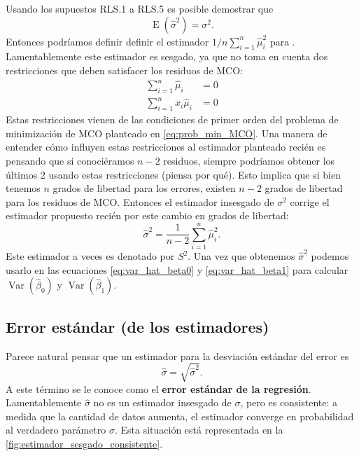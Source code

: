 \documentclass{report}\usepackage[]{graphicx}\usepackage[]{color}
\newcommand*{\kw}[1]{\textbf{#1}\index{#1}}
\newcommand{\Var}{\operatorname{Var}}
\newcommand{\E}{\operatorname{E}}
\begin{document}
Usando los supuestos RLS.1 a RLS.5 es posible demostrar que
\begin{equation}
\E(\hat\sigma^2) = \sigma^2.
\end{equation}
Entonces podríamos definir definir el estimador $1/n \sum_{i=1}^n \hat\mu_i^2$ para . Lamentablemente este estimador es sesgado, ya que no toma en cuenta dos restricciones que deben satisfacer los residuos de MCO:
\begin{align*}
\sum_{i=1}^n \hat\mu_i &= 0 \\
\sum_{i=1}^n x_i\hat\mu_i &= 0
\end{align*}
Estas restricciones vienen de las condiciones de primer orden del problema de minimización de MCO planteado en \eqref{eq:prob_min_MCO}.
Una manera de entender cómo influyen estas restricciones al estimador planteado recién es pensando que si conociéramos $n-2$ residuos, siempre podríamos obtener los últimos 2 usando estas restricciones (piensa por qué).
Esto implica que si bien tenemos $n$ grados de libertad para los errores, existen $n-2$ grados de libertad para los residuos de MCO.
Entonces el estimador insesgado de $\sigma^2$ corrige el estimador propuesto recién por este cambio en grados de libertad:
\begin{equation}
\hat\sigma^2 = \frac{1}{n-2} \sum_{i=1}^n \hat \mu_i^2.
\end{equation}
Este estimador a veces es denotado por $S^2$.
Una vez que obtenemos $\hat\sigma^2$ podemos usarlo en las ecuaciones \eqref{eq:var_hat_beta0} y \eqref{eq:var_hat_beta1} para calcular $\Var(\hat\beta_0)$ y $\Var(\hat\beta_1)$.

\subsection{Error estándar (de los estimadores)}

Parece natural pensar que un estimador para la desviación estándar del error es
\begin{equation}
\hat\sigma = \sqrt{\hat\sigma^2}.
\end{equation}
A este término se le conoce como el \kw{error estándar de la regresión}. Lamentablemente $\hat\sigma$ no es un estimador insesgado de $\sigma$, pero es consistente: a medida que la cantidad de datos aumenta, el estimador converge en probabilidad al verdadero parámetro $\sigma$.
Esta situación está representada en la \autoref{fig:estimador_sesgado_consistente}.
\end{document}

